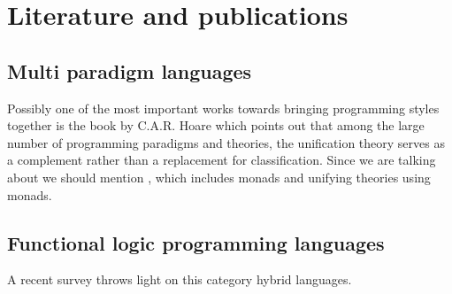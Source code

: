 \documentclass[thesis-solanki.tex]{subfiles}
\begin{document}


\section{Literature and publications}
\subsection{Multi paradigm languages}
Possibly one of the most important works towards bringing programming styles together is the book \cite{hoare1998unifying} by C.A.R.
Hoare which points out that among the large number of programming paradigms and
theories, the unification theory serves as a complement rather than a replacement for classification.
Since we are talking about  we should mention \cite{gibbons2013unifying}, which includes monads and unifying theories using
monads.
 

\subsection{Functional logic programming languages}

A recent survey \cite{hanus2007multi} throws light on this category hybrid languages. 
\end{document}
